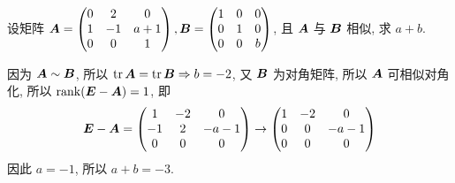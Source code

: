 \begin{example}
    设矩阵 $\vb*{A}=\begin{pmatrix} 0 & 2 & 0 \\ 1 & -1 & a+1 \\ 0 & 0 & 1 \\\end{pmatrix}, \vb*{B}=\begin{pmatrix} 1 & 0 & 0 \\ 0 & 1 & 0 \\ 0 & 0 & b \\\end{pmatrix}$, 且 $\vb*{A}$ 与 $\vb*{B}$ 相似, 求 $a+b.$
\end{example}
\begin{solution}
    因为 $\vb*{A}\sim \vb*{B}$, 所以 $\tr\vb*{A}=\tr\vb*{B}\Rightarrow b=-2$, 又 $\vb*{B}$ 为对角矩阵, 所以 $\vb*{A}$ 可相似对角化, 所以 $\rank(\vb*{E}-\vb*{A})=1$, 即 
    $$
    \vb*{E}-\vb*{A}=\begin{pmatrix} 1 & -2 & 0 \\ -1 & 2 & -a-1 \\ 0 & 0 & 0 \\\end{pmatrix}\to \begin{pmatrix} 1 & -2 & 0 \\ 0 & 0 & -a-1 \\ 0 & 0 & 0 \\\end{pmatrix}
    $$
    因此 $a=-1$, 所以 $a+b=-3.$
\end{solution}


